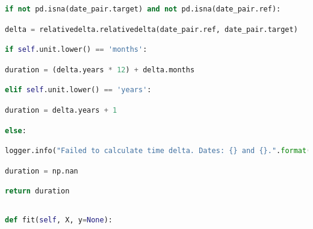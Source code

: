 \documentclass[
  11pt,
  a4paper,
  DIV=12,captions=tableheading,oneside]{scrbook}
\begin{document}
\begin{lstlisting}[language=Python,stepnumber=2,basicstyle=\footnotesize]
        if not pd.isna(date_pair.target) and not pd.isna(date_pair.ref):\end{lstlisting}
\begin{lstlisting}[language=Python,stepnumber=2,basicstyle=\footnotesize]
            delta = relativedelta.relativedelta(date_pair.ref, date_pair.target)\end{lstlisting}
\begin{lstlisting}[language=Python,stepnumber=2,basicstyle=\footnotesize]
            if self.unit.lower() == 'months':\end{lstlisting}
\begin{lstlisting}[language=Python,stepnumber=2,basicstyle=\footnotesize]
                duration = (delta.years * 12) + delta.months\end{lstlisting}
\begin{lstlisting}[language=Python,stepnumber=2,basicstyle=\footnotesize]
            elif self.unit.lower() == 'years':\end{lstlisting}
\begin{lstlisting}[language=Python,stepnumber=2,basicstyle=\footnotesize]
                duration = delta.years + 1\end{lstlisting}
\begin{lstlisting}[language=Python,stepnumber=2,basicstyle=\footnotesize]
        else:\end{lstlisting}
\begin{lstlisting}[language=Python,stepnumber=2,basicstyle=\footnotesize]
            logger.info("Failed to calculate time delta. Dates: {} and {}.".format(date_pair.target, date_pair.ref))\end{lstlisting}
\begin{lstlisting}[language=Python,stepnumber=2,basicstyle=\footnotesize]
            duration = np.nan\end{lstlisting}
\begin{lstlisting}[language=Python,stepnumber=2,basicstyle=\footnotesize]
        return duration\end{lstlisting}
\begin{lstlisting}[language=Python,stepnumber=2,basicstyle=\footnotesize]
\end{lstlisting}
\begin{lstlisting}[language=Python,stepnumber=2,basicstyle=\footnotesize]
    def fit(self, X, y=None):\end{lstlisting}
\end{document}
